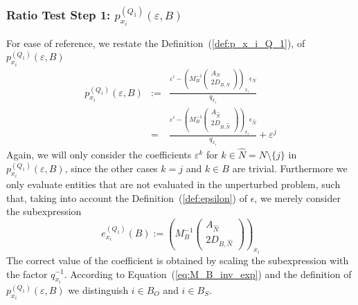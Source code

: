 \documentclass[a4paper]{article}
\begin{document}
\subsubsection{Ratio Test Step 1:
$p_{x_{i}}^{(Q_{1})}(\varepsilon, B)$}
For ease of reference, we restate the Definition~(\ref{def:p_x_i_Q_1}),
of $p_{x_{i}}^{(Q_{1})}(\varepsilon, B)$
\begin{eqnarray*}
p_{x_{i}}^{(Q_{1})}\left(\varepsilon, B\right) &:=&
  \frac{\varepsilon^{i} -
         \left(M_{B}^{-1}
           \left(\begin{array}{c}
                    A_{N}  \\
	            \hline
	            2D_{B, N}
	         \end{array}
	   \right)
         \right)_{x_{i}}\epsilon_{N}}{q_{x_{i}}}
\\
&=&
\frac{\varepsilon^{i} -
         \left(M_{B}^{-1}
           \left(\begin{array}{c}
                    A_{\hat{N}}  \\
	            \hline
	            2D_{B, \hat{N}}
	         \end{array}
	   \right)
         \right)_{x_{i}}\epsilon_{\hat{N}}}{q_{x_{i}}}
+ \varepsilon^{j}
\end{eqnarray*}
Again, we will only consider the coefficients
$\varepsilon^{k}$ for $k \in \hat{N}= N \setminus \{j\}$ in
$p_{x_{i}}^{(Q_{1})}(\varepsilon, B)$, since the other cases $k=j$ and $k \in B$
are trivial. Furthermore we only evaluate entities that are not evaluated in the
unperturbed problem, such that, taking into account the
Definition~(\ref{def:epsilon}) of $\epsilon$, we merely consider
the subexpression
\begin{equation}
\label{def:e_x_i_Q_1}
e_{x_{i}}^{(Q_{1})}(B):=
\left(M_{B}^{-1}
           \left(\begin{array}{c}
                    A_{\hat{N}}  \\
	            \hline
	            2D_{B, \hat{N}}
	         \end{array}
	   \right)
         \right)_{x_{i}}
\end{equation}
The correct value of the coefficient is obtained by scaling the subexpression
with the factor $q_{x_{i}}^{-1}$.
According to Equation~(\ref{eq:M_B_inv_exp}) and the definition of
$p_{x_{i}}^{(Q_{1})}(\varepsilon, B)$ we distinguish $i \in B_{O}$ and
$i \in B_{S}$.
\end{document}
